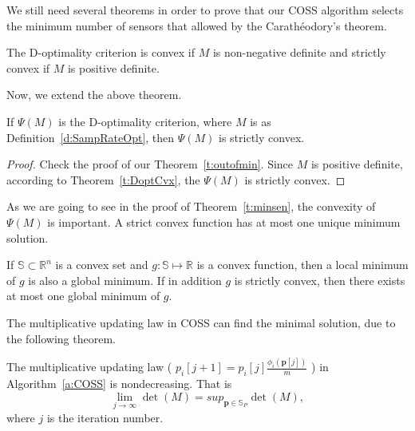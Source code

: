 
We still need several theorems in order to prove that our COSS algorithm selects the minimum number of sensors that allowed by the Carath\'{e}odory's theorem.

\begin{thm}\label{t:DoptCvx}
The D-optimality criterion is convex if $M$ is non-negative definite and strictly convex if $M$ is positive definite.
\end{thm}

Now, we extend the above theorem.

\begin{cor}\label{t:DoptStrictCvx}
If $\Psi(M)$ is the D-optimality criterion, where $M$ is as Definition~\ref{d:SampRateOpt}, then $\Psi(M)$ is strictly convex.
\end{cor}
\begin{proof}
Check the proof of our Theorem~\ref{t:outofmin}. Since  $M$ is positive definite, according to Theorem~\ref{t:DoptCvx}, the $\Psi(M)$ is strictly convex.
\end{proof}
\begin{remark}
As we are going to see in the proof of Theorem~\ref{t:minsen}, the convexity of $\Psi(M)$ is important. A strict convex function has at most one unique minimum solution.
\end{remark}


\begin{thm} \label{t:cvxUnique}
If $\mathbb{S}\subset \mathbb{R}^n$ is a convex set and $g:\mathbb{S}\mapsto \mathbb{R}$ is a convex function, then a local minimum of $g$ is also a global minimum. If in addition $g$ is strictly convex, then there exists at most one global minimum of $g$.
\end{thm}


The multiplicative updating law in COSS can find the minimal solution, due to the following theorem.

\begin{thm} \label{t:nodescreasing}
The multiplicative updating law (
               $p_{i}[j+1]=p_{i}[j]\frac{\phi_{i}(\mathbf{p}[j])}{m}$ )
in Algorithm~\ref{a:COSS} is nondecreasing. That is
$$ \lim_{j\rightarrow \infty} \det(M) = sup_{\mathbf{p}\in\mathbb{S}_P} \det(M),$$
where $j$ is the iteration number.
\end{thm}


